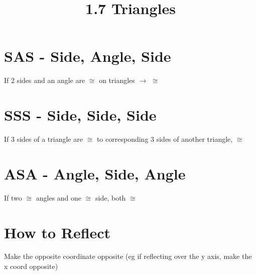 \documentclass{article}
\begin{document}
	
	\setlength{\droptitle}{-5em}
	\title{1.7 Triangles}
	\date{}
	\author{}
	\maketitle
	
	\section{SAS - Side, Angle, Side}
	If 2 sides and an angle are $\cong$ on triangles $\rightarrow$ $\cong$
	
	\section{SSS - Side, Side, Side}
	If 3 sides of a triangle are $\cong$ to corresponding 3 sides of another triangle, $\cong$
	
	\section{ASA - Angle, Side, Angle}
	If two $\cong$ angles and one $\cong$ side, both $\cong$
	
	
	\section{How to Reflect}
	Make the opposite coordinate opposite (eg if reflecting over the y axis, make the x coord opposite)
\end{document}
